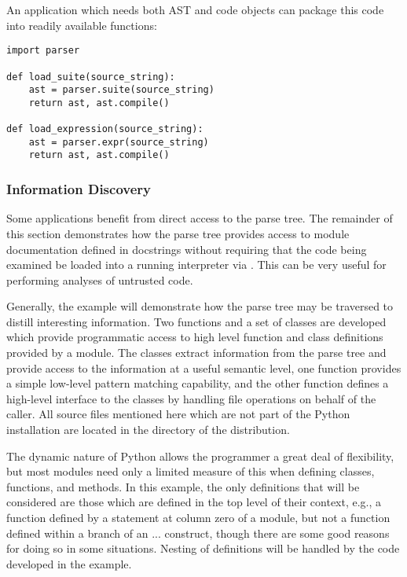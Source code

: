 An application which needs both AST and code objects can package this
code into readily available functions:

\begin{verbatim}
import parser

def load_suite(source_string):
    ast = parser.suite(source_string)
    return ast, ast.compile()

def load_expression(source_string):
    ast = parser.expr(source_string)
    return ast, ast.compile()
\end{verbatim}

\subsubsection{Information Discovery}

Some applications benefit from direct access to the parse tree.  The
remainder of this section demonstrates how the parse tree provides
access to module documentation defined in
docstrings without
requiring that the code being examined be loaded into a running
interpreter via .  This can be very useful for
performing analyses of untrusted code.

Generally, the example will demonstrate how the parse tree may be
traversed to distill interesting information.  Two functions and a set
of classes are developed which provide programmatic access to high
level function and class definitions provided by a module.  The
classes extract information from the parse tree and provide access to
the information at a useful semantic level, one function provides a
simple low-level pattern matching capability, and the other function
defines a high-level interface to the classes by handling file
operations on behalf of the caller.  All source files mentioned here
which are not part of the Python installation are located in the
 directory of the distribution.

The dynamic nature of Python allows the programmer a great deal of
flexibility, but most modules need only a limited measure of this when
defining classes, functions, and methods.  In this example, the only
definitions that will be considered are those which are defined in the
top level of their context, e.g., a function defined by a 
statement at column zero of a module, but not a function defined
within a branch of an  ...  construct, though
there are some good reasons for doing so in some situations.  Nesting
of definitions will be handled by the code developed in the example.

